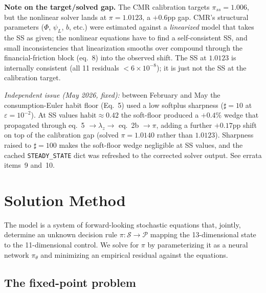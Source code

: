 \documentclass[11pt]{article}
\begin{document}
\begin{table}[h!]
\begin{minipage}[t]{0.45\linewidth}
\textbf{Note on the target/solved gap.}
The CMR calibration targets $\pi_{ss} = 1.006$, but the nonlinear solver
lands at $\pi = 1.0123$, a $+0.6$pp gap. CMR's structural parameters
($\Phi$, $\psi_L$, $b$, etc.) were estimated against a \emph{linearized}
model that takes the SS as given; the nonlinear equations have to find
a self-consistent SS, and small inconsistencies that linearization
smooths over compound through the financial-friction block (eq.~8) into
the observed shift. The SS at $1.0123$ is internally consistent (all 11
residuals $< 6\times 10^{-8}$); it is just not the SS at the calibration
target.

\emph{Independent issue (May 2026, fixed):} between February and May
the consumption-Euler habit floor (Eq.~5) used a low softplus sharpness
($\sharp = 10$ at $\varepsilon = 10^{-2}$). At SS values
$\text{habit} \approx 0.42$ the soft-floor produced a $+0.4\%$ wedge
that propagated through eq.~5 $\to \lambda_z \to$ eq.~2b $\to \pi$,
adding a further $+0.17$pp shift on top of the calibration gap
(solved $\pi = 1.0140$ rather than $1.0123$). Sharpness raised to
$\sharp = 100$ makes the soft-floor wedge negligible at SS values, and
the cached \texttt{STEADY\_STATE} dict was refreshed to the corrected
solver output. See errata items~9 and~10.
\end{minipage}
\end{table}


\section{Solution Method}
\label{sec:method}

The model is a system of forward-looking stochastic equations that,
jointly, determine an unknown decision rule
$\pi: \mathcal{S} \to \mathcal{P}$ mapping the 13-dimensional state to
the 11-dimensional control. We solve for $\pi$ by parameterizing it as
a neural network $\pi_\theta$ and minimizing an empirical residual
against the equations.

\subsection{The fixed-point problem}
\end{document}
